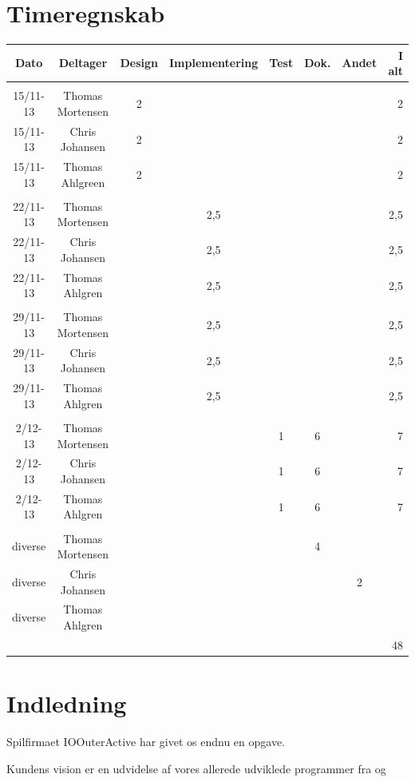 \documentclass{article}
\begin{document}
\section*{Timeregnskab}
\begin{tabular}{|c|c|c|c|c|c|c|r|} \hline
 Dato & Deltager & Design & Implementering & Test & Dok. & Andet & I alt \\ \hline
&&&&&&& \\ \hline
 15/11-13 & Thomas Mortensen & 2& & & & & 2\\ \hline
 15/11-13 & Chris Johansen & 2& & & & &2 \\ \hline
 15/11-13 & Thomas Ahlgreen & 2& & & & & 2\\ \hline
 &&&&&&& \\ \hline
 22/11-13 & Thomas Mortensen & & 2,5& & & &2,5 \\ \hline
 22/11-13 & Chris Johansen & &2,5 & & & &2,5 \\ \hline
 22/11-13 & Thomas Ahlgren & & 2,5& & & &2,5 \\ \hline
 &&&&&&& \\ \hline
 29/11-13 & Thomas Mortensen & &2,5 & & & &2,5 \\ \hline
 29/11-13 & Chris Johansen & &2,5 & & & & 2,5 \\ \hline
 29/11-13 & Thomas Ahlgren & &2,5 & & & & 2,5 \\ \hline
 &&&&&&& \\ \hline
 2/12-13 & Thomas Mortensen & & &1 &6 & &7 \\ \hline
 2/12-13 & Chris Johansen & & &1 &6 & &7 \\ \hline
 2/12-13 & Thomas Ahlgren & & &1 &6 & &7 \\ \hline
 &&&&&&& \\ \hline
 diverse & Thomas Mortensen & & & &4 & & \\ \hline
 diverse & Chris Johansen & & & & &2 & \\ \hline
 diverse & Thomas Ahlgren & & & & & & \\ \hline
 &&&&&&& 48\\ \hline
\end{tabular}
\newpage
\tableofcontents
\newpage
\section{Indledning}
Spilfirmaet IOOuterActive har givet os endnu en opgave.

Kundens vision er en udvidelse af vores allerede udviklede programmer fra \cite{19del1} og \cite{19del2}
\end{document}
